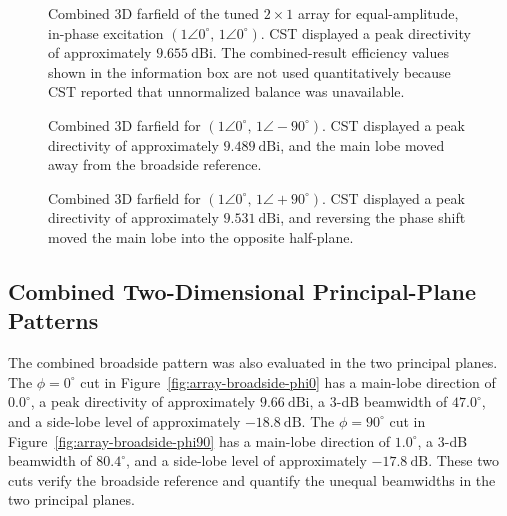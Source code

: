 \begin{figure}[H]
    \centering
    \caption[Combined broadside 3D farfield.]{Combined 3D farfield of the tuned \(2\times1\) array for equal-amplitude, in-phase excitation \((1\angle0^\circ,\,1\angle0^\circ)\). CST displayed a peak directivity of approximately \(9.655~\mathrm{dBi}\). The combined-result efficiency values shown in the information box are not used quantitatively because CST reported that unnormalized balance was unavailable.}
    \label{fig:array-broadside}
\end{figure}

\begin{figure}[H]
    \centering
    \caption[Combined 3D farfield for a \(-90^\circ\) phase shift.]{Combined 3D farfield for \((1\angle0^\circ,\,1\angle-90^\circ)\). CST displayed a peak directivity of approximately \(9.489~\mathrm{dBi}\), and the main lobe moved away from the broadside reference.}
    \label{fig:array-minus90}
\end{figure}

\begin{figure}[H]
    \centering
    \caption[Combined 3D farfield for a \(+90^\circ\) phase shift.]{Combined 3D farfield for \((1\angle0^\circ,\,1\angle+90^\circ)\). CST displayed a peak directivity of approximately \(9.531~\mathrm{dBi}\), and reversing the phase shift moved the main lobe into the opposite half-plane.}
    \label{fig:array-plus90}
\end{figure}

\subsection{Combined Two-Dimensional Principal-Plane Patterns}

The combined broadside pattern was also evaluated in the two principal planes. The
\(\phi=0^\circ\) cut in Figure~\ref{fig:array-broadside-phi0} has a main-lobe direction of
\(0.0^\circ\), a peak directivity of approximately \(9.66~\mathrm{dBi}\), a 3-dB beamwidth of
\(47.0^\circ\), and a side-lobe level of approximately \(-18.8~\mathrm{dB}\). The
\(\phi=90^\circ\) cut in Figure~\ref{fig:array-broadside-phi90} has a main-lobe direction of
\(1.0^\circ\), a 3-dB beamwidth of \(80.4^\circ\), and a side-lobe level of approximately
\(-17.8~\mathrm{dB}\). These two cuts verify the broadside reference and quantify the unequal
beamwidths in the two principal planes.

